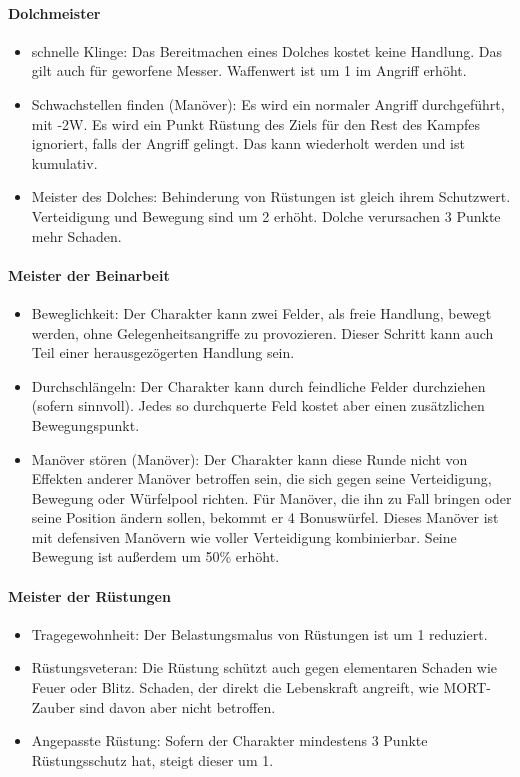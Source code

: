 \documentclass{article}
\begin{document}
\paragraph{Dolchmeister}

\begin{itemize}
\item schnelle Klinge: Das Bereitmachen eines Dolches kostet keine Handlung. Das gilt auch für geworfene Messer. Waffenwert ist um 1 im Angriff erhöht.
\item Schwachstellen finden (Manöver): Es wird ein normaler Angriff durchgeführt, mit -2W. Es wird ein Punkt Rüstung des Ziels für den Rest des Kampfes ignoriert, falls der Angriff gelingt. Das kann wiederholt werden und ist kumulativ.
\item Meister des Dolches: Behinderung von Rüstungen ist gleich ihrem Schutzwert. Verteidigung und Bewegung sind um 2 erhöht. Dolche verursachen 3 Punkte mehr Schaden.
\end{itemize}

\paragraph{Meister der Beinarbeit}

\begin{itemize}
\item Beweglichkeit: Der Charakter kann zwei Felder, als freie Handlung, bewegt werden, ohne Gelegenheitsangriffe zu provozieren. Dieser Schritt kann auch Teil einer herausgezögerten Handlung sein.
\item Durchschlängeln: Der Charakter kann durch feindliche Felder durchziehen (sofern sinnvoll). Jedes so durchquerte Feld kostet aber einen zusätzlichen Bewegungspunkt.
\item Manöver stören (Manöver): Der Charakter kann diese Runde nicht von Effekten anderer Manöver betroffen sein, die sich gegen seine Verteidigung, Bewegung oder Würfelpool richten. Für Manöver, die ihn zu Fall bringen oder seine Position ändern sollen, bekommt er 4 Bonuswürfel. Dieses Manöver ist mit defensiven Manövern wie voller Verteidigung kombinierbar. Seine Bewegung ist außerdem um 50\% erhöht.
\end{itemize}

\paragraph{Meister der Rüstungen}

\begin{itemize}
\item Tragegewohnheit: Der Belastungsmalus von Rüstungen ist um 1 reduziert.
\item Rüstungsveteran: Die Rüstung schützt auch gegen elementaren Schaden wie Feuer oder Blitz. Schaden, der direkt die Lebenskraft angreift, wie MORT-Zauber sind davon aber nicht betroffen.
\item Angepasste Rüstung: Sofern der Charakter mindestens 3 Punkte Rüstungsschutz hat, steigt dieser um 1.
\end{itemize}
\end{document}

